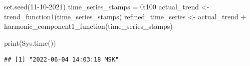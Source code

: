 \documentclass[specialist,
               substylefile = spbu_report.rtx,
               subf,href,colorlinks=true, 12pt]{disser}
\theoremstyle{definition}
\newenvironment{Shaded}{\begin{snugshade}}{\end{snugshade}}
\newcommand{\DecValTok}[1]{\textcolor[rgb]{0.00,0.00,0.81}{#1}}
\newcommand{\FunctionTok}[1]{\textcolor[rgb]{0.00,0.00,0.00}{#1}}
\newcommand{\NormalTok}[1]{#1}
\newcommand{\OtherTok}[1]{\textcolor[rgb]{0.56,0.35,0.01}{#1}}
\newcommand{\SpecialCharTok}[1]{\textcolor[rgb]{0.00,0.00,0.00}{#1}}
\begin{document}
\begin{Shaded}
\begin{Highlighting}[]
  \FunctionTok{set.seed}\NormalTok{(}\DecValTok{11{-}10{-}2021}\NormalTok{)}
\NormalTok{  time\_series\_stamps }\OtherTok{=} \DecValTok{0}\SpecialCharTok{:}\DecValTok{100}
\NormalTok{  actual\_trend }\OtherTok{\textless{}{-}} \FunctionTok{trend\_function1}\NormalTok{(time\_series\_stamps)}
\NormalTok{  refined\_time\_series }\OtherTok{\textless{}{-}}\NormalTok{ actual\_trend }\SpecialCharTok{+} \FunctionTok{harmonic\_component1\_function}\NormalTok{(time\_series\_stamps)}
\end{Highlighting}
\end{Shaded}

\begin{Shaded}
\begin{Highlighting}[]
  \FunctionTok{print}\NormalTok{(}\FunctionTok{Sys.time}\NormalTok{())}
\end{Highlighting}
\end{Shaded}

\begin{verbatim}
## [1] "2022-06-04 14:03:18 MSK"
\end{verbatim}
\end{document}
